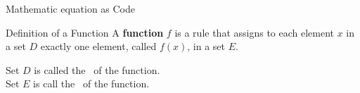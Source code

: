 \documentclass{beamer}
\begin{document}
\begin{frame}[t]{Mathematic equation as Code}\vspace{10pt}
  \begin{block}{Definition of a Function}
    \vspace{0.5em}
    A \textbf{function} $f$ is a rule that assigns to each element $x$ in a set $D$ exactly one element, called $f(x)$, in a set $E$.
          \vspace{0.5em}
  \end{block}

\vspace{10pt}
Set $D$ is called the 
\, of the function. \\ [10pt]
Set $E$ is call the  
\, of the function. 
\end{frame}
\end{document}
